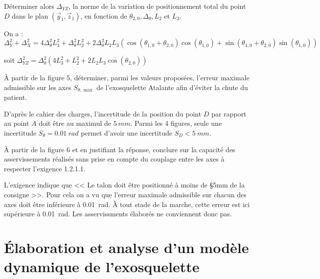 \documentclass[11pt]{article}
\begin{document}
\UPSTIquestion Déterminer alors $\Delta_{Y Z}$, la norme de la variation de positionnement total du point $D$ dans le plan $\left(\vec{y}_{1}, \vec{z}_{1}\right)$, en fonction de $\theta_{2,0}, \Delta_{\theta}, L_{2}$ et $L_{3}$.

\begin{UPSTIcorrige}
 On a : 
$\Delta_{Y}^2 + \Delta_{X}^2 = 4\Delta_{\theta}^2L_3^2 + \Delta_{\theta}^2L_2^2 
+ 2\Delta_{\theta}^2 L_2 L_3 \left( \cos \left(\theta_{1,0}+ \theta_{2,0}\right)  \cos \left(\theta_{1,0}\right)
+  \sin \left(\theta_{1,0}+ \theta_{2,0}\right)  \sin \left(\theta_{1,0}\right) \right)$

soit 
$\Delta_{YZ}^2 = \Delta_{\theta}^2 \left(4L_3^2 + L_2^2 
+ 2 L_2 L_3 \cos \left(\theta_{2,0} \right)\right)$
\end{UPSTIcorrige}

\UPSTIquestion À partir de la figure 5, déterminer, parmi les valeurs proposées, l'erreur maximale admissible sur les axes $S_{\theta, \max }$ de l'exosquelette Atalante afin d'éviter la chute du patient.

\begin{UPSTIcorrige}
D'après le cahier des charges, l'incertitude de la position du point
$D$ par rapport au point  $A$  doit être au maximul de $\SI{5}{mm}$. Parmi les 4 figures, seule une incertitude $S_{\theta}=\SI{0,01}{rad}$ permet d'avoir une incertitude $S_D < \SI{5}{mm}$.

\end{UPSTIcorrige}

\UPSTIquestion À partir de la figure 6 et en justifiant la réponse, conclure sur la capacité des asservissements réalisés sans prise en compte du couplage entre les axes à respecter l'exigence 1.2.1.1.

\begin{UPSTIcorrige}
L'exigence indique que << Le talon doit être positionné à moins de
\S{5}{mm} de la consigne >>. Pour cela on a vu que l'erreur maximale admissible sur chacun des axes doit être inférieure à \SI{0,01}{rad}. À tout stade de la marche, cette erreur est ici supérieure à \SI{0,01}{rad}. Les asservissments élaborés ne conviennent donc pas.
\end{UPSTIcorrige}


\section{Élaboration et analyse d'un modèle dynamique de l'exosquelette}
\end{document}
